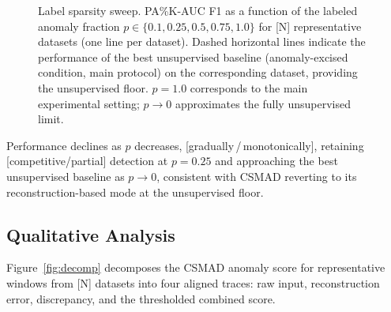 \begin{figure}[tbp]
  \centering
  \caption{Label sparsity sweep. PA\%K-AUC F1 as a function of the labeled anomaly fraction
    $p \in \{0.1, 0.25, 0.5, 0.75, 1.0\}$ for [N] representative datasets (one line per
    dataset).
    Dashed horizontal lines indicate the performance of the best unsupervised baseline
    (anomaly-excised condition, main protocol) on the corresponding dataset, providing the
    unsupervised floor.
    $p = 1.0$ corresponds to the main experimental setting; $p \to 0$ approximates the fully
    unsupervised limit.}
  \label{fig:sparsity}
\end{figure}

Performance declines as $p$ decreases, [gradually\,/\,monotonically], %
retaining [competitive/partial] detection at $p = 0.25$ and approaching the best unsupervised
baseline as $p \to 0$, consistent with CSMAD reverting to its reconstruction-based mode at the
unsupervised floor.

\subsection{Qualitative Analysis}
\label{sec:qualitative}

Figure~\ref{fig:decomp} decomposes the CSMAD anomaly score for representative windows from [N]
datasets into four aligned traces: raw input, reconstruction error, discrepancy, and the
thresholded combined score.

